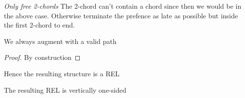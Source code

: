       \emph{Only free 2-chords}
      The 2-chord can't contain a chord since then we would be in the above case. Otherwise terminate the prefence as late as possible but inside the first 2-chord to end.

      \begin{lemma}
        \label{lm:}
        We always augment with a valid path
      \end{lemma}
      \begin{proof}
        By construction
      \end{proof}

      Hence the resulting structure is a REL 



      \begin{lemma}
        \label{lm:}
        The resulting REL is vertically one-sided
      \end{lemma}
